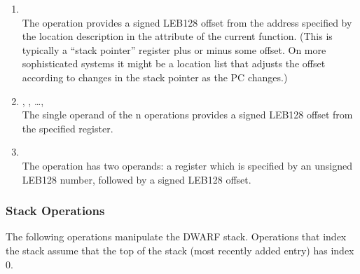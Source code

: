 \begin{enumerate}[1]

\item {} \\
The  operation provides a signed LEB128 offset
from the address specified by the location description in the
 attribute of the current function. (This
is typically a “stack pointer” register plus or minus
some offset. On more sophisticated systems it might be a
location list that adjusts the offset according to changes
in the stack pointer as the PC changes.)

\item {}, , \dots,  \\
The single operand of the n 
operations provides
a signed LEB128 offset from
the specified register.

\item {} \\
The  operation has two operands: a register
which is specified by an unsigned LEB128 number, followed by
a signed LEB128 offset.

\end{enumerate}


\subsubsection{Stack Operations}
\label{chap:stackoperations}
The following 
operations manipulate the DWARF stack. Operations
that index the stack assume that the top of the stack (most
recently added entry) has index 0.

